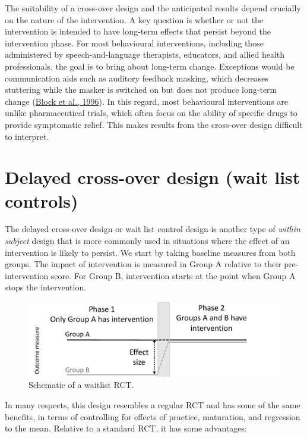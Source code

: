 \documentclass{krantz}
\begin{document}
The suitability of a cross-over design and the anticipated results depend crucially on the nature of the intervention. A key question is whether or not the intervention is intended to have long-term effects that persist beyond the intervention phase. For most behavioural interventions, including those administered by speech-and-language therapists, educators, and allied health professionals, the goal is to bring about long-term change. Exceptions would be communication aids such as auditory feedback masking, which decreases stuttering while the masker is switched on but does not produce long-term change (\protect\hyperlink{ref-block1996}{Block et al., 1996}). In this regard, most behavioural interventions are unlike pharmaceutical trials, which often focus on the ability of specific drugs to provide symptomatic relief. This makes results from the cross-over design difficult to interpret.

\hypertarget{delayed-cross-over-design-wait-list-controls}{%
\section{Delayed cross-over design (wait list controls)}\label{delayed-cross-over-design-wait-list-controls}}

The delayed cross-over design or wait list control design is another type of \emph{within subject} design that is more commonly used in situations where the effect of an intervention is likely to persist. We start by taking baseline measures from both groups. The impact of intervention is measured in Group A relative to their pre-intervention score. For Group B, intervention starts at the point when Group A stops the intervention.

\begin{figure}
\includegraphics[width=0.8\linewidth]{images_bw/waitlist} \caption{Schematic of a waitlist RCT.}\label{fig:waitlist-plot}
\end{figure}

In many respects, this design resembles a regular RCT and has some of the same benefits, in terms of controlling for effects of practice, maturation, and regression to the mean. Relative to a standard RCT, it has some advantages:
\end{document}
